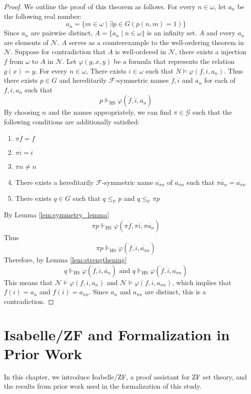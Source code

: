 \documentclass{report}
\newcommand{\Pbb}{\mathbb{P}}
\newcommand{\Gcal}{\mathcal{G}}
\newcommand{\Fcal}{\mathcal{F}}
\newcommand{\Ncal}{\mathcal{N}}
\begin{document}
\begin{proof}
We outline the proof of this theorem as follows. 
For every $n \in \omega$, let $a_n$ be the following real number:
$$a_n = \{ m \in \omega \mid \exists p \in G (p(n, m) = 1) \}$$
Since $a_n$ are pairwise distinct, $A = \{ a_n \mid n \in \omega \}$ is an infinity set.
$A$ and every $a_n$ are elements of $\Ncal$.
$A$ serves as a counterexample to the well-ordering theorem in $\Ncal$.
Suppose for contradiction that $A$ is well-ordered in $\Ncal$, there exists a injection $f$ from $\omega$ to $A$ in $\Ncal$.
Let $\varphi(g,x,y)$ be a formula that represents the relation $g(x) = y$. 
For every $n \in \omega$, There exists $i \in \omega$ such that $N \vDash \varphi(f, i, a_n)$.
Thus there exists $p \in G$ and hereditarily $\Fcal$-symmetric names $\dot{f}, \dot{i}$ and $\dot{a_n}$ for each of $f, i, a_n$ such that 
$$p \Vdash_{\text{HS}} \varphi(\dot{f}, \dot{i}, \dot{a_n})$$
By choosing $n$ and the names appropriately, we can find $\pi \in \Gcal$ such that the following conditions are additionally satisfied:
\begin{enumerate}
  \item $\pi \dot{f} = \dot{f}$
  \item $\pi \dot{i} = \dot{i}$
  \item $\pi n \ne n$
  \item There exists a hereditarily $\Fcal$-symmetric name $\dot{a_{\pi n}}$ of $a_{\pi n}$ such that $\pi \dot{a_n} = \dot{a_{\pi n}}$
  \item There exists $q \in G$ such that $q \leq_{\Pbb} p$ and $q \leq_{\Pbb} \pi p$
\end{enumerate}
By Lemma \ref{lem:symmetry_lemma}
$$\pi p \Vdash_{\text{HS}} \varphi(\pi \dot{f}, \pi \dot{i}, \pi \dot{a_n})$$
Thus 
$$\pi p \Vdash_{\text{HS}} \varphi(\dot{f}, \dot{i}, \dot{a_{\pi n}})$$
Therefore, by Lemma \ref{lem:strengthening}
$$q \Vdash_{\text{HS}} \varphi(\dot{f}, \dot{i}, \dot{a_n}) \text{ and } q \Vdash_{\text{HS}} \varphi(\dot{f}, \dot{i}, \dot{a_{\pi n}})$$
This means that $\Ncal \vDash \varphi(f, i, a_n)$ and $\Ncal \vDash \varphi(f, i, a_{\pi n})$, which implies that $f(i) = a_n$ and $f(i) = a_{\pi n}$.
Since $a_n$ and $a_{\pi n}$ are distinct, this is a contradiction. 
\end{proof}
 
\chapter{Isabelle/ZF and Formalization in Prior Work}
In this chapter, we introduce Isabelle/ZF, a proof assistant for ZF set theory, 
and the results from prior work used in the formalization of this study.
\end{document}
